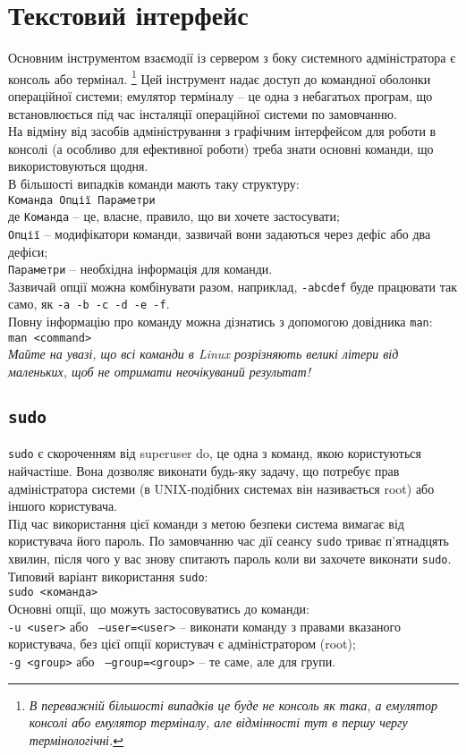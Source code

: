\documentclass[10pt,a4paper]{fancyhandout}
\begin{document}
\section{Текстовий інтерфейс}
Основним інструментом взаємодії із сервером з боку системного адміністратора є консоль або термінал.
\footnote{\textit{В переважній більшості випадків це буде не консоль як така, а емулятор консолі або емулятор терміналу, але відмінності тут в першу чергу термінологічні.}}
Цей інструмент надає доступ до командної оболонки операційної системи; емулятор терміналу -- це одна з небагатьох програм, що встановлюється під час інсталяції операційної системи по замовчанню. \\
На відміну від засобів адміністрування з графічним інтерфейсом для роботи в консолі (а особливо для ефективної роботи) треба знати основні команди, що використовуються щодня. \\
В більшості випадків команди мають таку структуру: \\
\texttt{Команда Опції Параметри} \\
де \texttt{Команда} -- це, власне, правило, що ви хочете застосувати; \\
\texttt{Опції} -- модифікатори команди, зазвичай вони задаються через дефіс або два дефіси; \\
\texttt{Параметри} -- необхідна інформація для команди. \\
Зазвичай опції можна комбінувати разом, наприклад, \texttt{-abcdef} буде працювати так само, як \texttt{-a -b -c -d -e -f}. \\
Повну інформацію про команду можна дізнатись з допомогою довідника \texttt{man}: \\
\texttt{man <command>}\\
\textit{Майте на увазі, що всі команди в Linux розрізняють великі літери від маленьких, щоб не отримати неочікуваний результат!}
\goodbreak

\subsection{\texttt{sudo}}
\texttt{sudo} є скороченням від superuser do, це одна з команд, якою користуються найчастіше. Вона дозволяє виконати будь-яку задачу, що потребує прав адміністратора системи (в UNIX-подібних системах він називається root) або іншого користувача. \\
Під час використання цієї команди з метою безпеки система вимагає від користувача його пароль. По замовчанню час дії сеансу \texttt{sudo} триває п'ятнадцять хвилин, після чого у вас знову спитають пароль коли ви захочете виконати \texttt{sudo}. \\
Типовий варіант використання \texttt{sudo}: \\
\texttt{sudo <команда>} \\
Основні опції, що можуть застосовуватись до команди: \\
\texttt{-u <user>} або \texttt{~---user=<user>} -- виконати команду з правами вказаного користувача, без цієї опції користувач є адміністратором (root); \\
\texttt{-g <group>} або \texttt{~---group=<group>} -- те саме, але для групи.
\goodbreak
\end{document}
